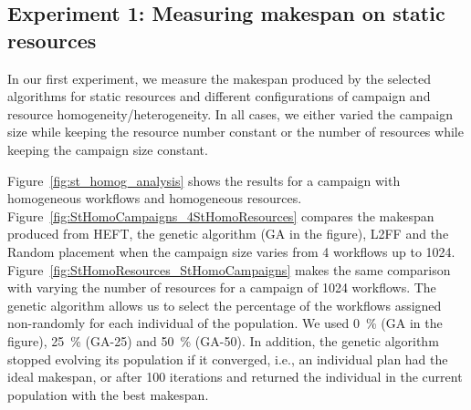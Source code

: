 \subsection{Experiment 1: Measuring makespan on static resources}

In our first experiment, we measure the makespan produced by the selected algorithms for static resources and different configurations of campaign and resource homogeneity/heterogeneity.
In all cases, we either varied the campaign size while keeping the resource number constant or the number of resources while keeping the campaign size constant.

Figure~\ref{fig:st_homog_analysis} shows the results for a campaign with homogeneous workflows and homogeneous resources.
Figure~\ref{fig:StHomoCampaigns_4StHomoResources} compares the makespan produced from HEFT, the genetic algorithm (GA in the figure), L2FF and the Random placement when the campaign size varies from 4 workflows up to 1024.
Figure~\ref{fig:StHomoResources_StHomoCampaigns} makes the same comparison with varying the number of resources for a campaign of 1024 workflows.
The genetic algorithm allows us to select the percentage of the workflows assigned non-randomly for each individual of the population.
We used 0~\% (GA in the figure), 25~\% (GA-25) and 50~\% (GA-50).
In addition, the genetic algorithm stopped evolving its population if it converged, i.e., an individual plan had the ideal makespan, or after 100 iterations and returned the individual in the current population with the best makespan.

